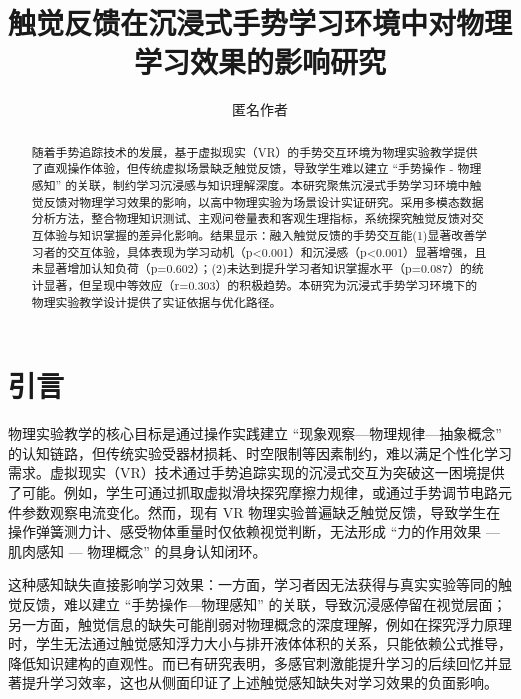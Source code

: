 \documentclass[runningheads]{llncs}
\begin{document}
\title{触觉反馈在沉浸式手势学习环境中对物理学习效果的影响研究}

\author{匿名作者}

\maketitle

\begin{abstract}
  随着手势追踪技术的发展，基于虚拟现实（VR）的手势交互环境为物理实验教学提供了直观操作体验，但传统虚拟场景缺乏触觉反馈，导致学生难以建立 “手势操作 - 物理感知” 的关联，制约学习沉浸感与知识理解深度。本研究聚焦沉浸式手势学习环境中触觉反馈对物理学习效果的影响，以高中物理实验为场景设计实证研究。采用多模态数据分析方法，整合物理知识测试、主观问卷量表和客观生理指标，系统探究触觉反馈对交互体验与知识掌握的差异化影响。结果显示：融入触觉反馈的手势交互能(1)显著改善学习者的交互体验，具体表现为学习动机（p<0.001）和沉浸感（p<0.001）显著增强，且未显著增加认知负荷（p=0.602）；(2)未达到提升学习者知识掌握水平（p=0.087）的统计显著，但呈现中等效应（r=0.303）的积极趋势。本研究为沉浸式手势学习环境下的物理实验教学设计提供了实证依据与优化路径。

\end{abstract}
 
\section{引言}
物理实验教学的核心目标是通过操作实践建立 “现象观察—物理规律—抽象概念” 的认知链路\cite{civelek2014effects,bao2019physics,freeman2014active}，但传统实验受器材损耗、时空限制等因素制约，难以满足个性化学习需求\cite{yang2007impact,ma2023investigation}。虚拟现实（VR）技术通过手势追踪实现的沉浸式交互为突破这一困境提供了可能\cite{yang2019gesture}。例如，学生可通过抓取虚拟滑块探究摩擦力规律，或通过手势调节电路元件参数观察电流变化。然而，现有 VR 物理实验普遍缺乏触觉反馈，导致学生在操作弹簧测力计、感受物体重量时仅依赖视觉判断，无法形成 “力的作用效果 — 肌肉感知 — 物理概念” 的具身认知闭环\cite{giri2021application}。

这种感知缺失直接影响学习效果：一方面，学习者因无法获得与真实实验等同的触觉反馈，难以建立 “手势操作—物理感知” 的关联，导致沉浸感停留在视觉层面\cite{app14114935}；另一方面，触觉信息的缺失可能削弱对物理概念的深度理解，例如在探究浮力原理时，学生无法通过触觉感知浮力大小与排开液体体积的关系，只能依赖公式推导，降低知识建构的直观性\cite{neri2024enhancing}。而已有研究表明，多感官刺激能提升学习的后续回忆并显著提升学习效率，这也从侧面印证了上述触觉感知缺失对学习效果的负面影响\cite{murray2023crossmodal}。
\end{document}
